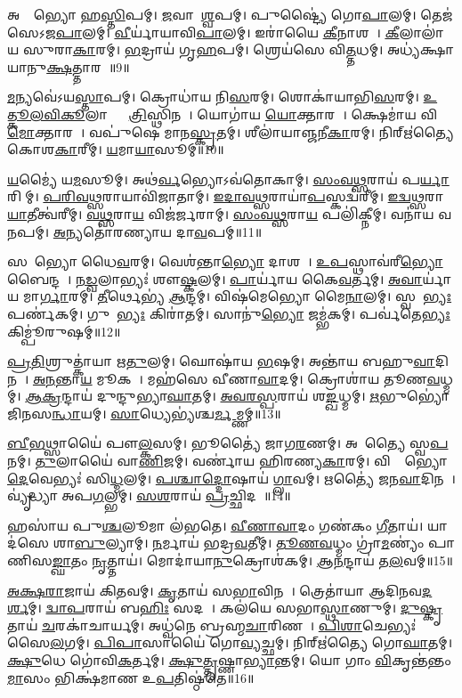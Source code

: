 𑌅𑌰𑍍𑌮𑍇᳚𑌭𑍍𑌯𑍋 𑌹\ul{𑌸𑍍𑌤𑌿}𑌪𑌮𑍍।
\ul{𑌜}𑌵𑌾𑌯𑌾᳚\ul{𑌶𑍍𑌵}𑌪𑌮𑍍।
𑌪𑍁𑌷𑍍𑌟𑍍𑌯𑍈॑ 𑌗𑍋\ul{𑌪𑌾}𑌲𑌮𑍍।
𑌤𑍇𑌜॑𑌸𑍇\-𑌽𑌜\ul{𑌪𑌾}𑌲𑌮𑍍।
\ul{𑌵𑍀}𑌰𑍍𑌯𑌾॑𑌯𑌾𑌵𑌿\ul{𑌪𑌾}𑌲𑌮𑍍।
𑌇𑌰𑌾॑𑌯𑍈 \ul{𑌕𑍀}𑌨𑌾𑌶𑌮𑍍᳚।
\ul{𑌕𑍀}𑌲𑌾𑌲𑌾॑𑌯 𑌸𑍁𑌰𑌾\ul{𑌕𑌾}𑌰𑌮𑍍।
\ul{𑌭}𑌦𑍍𑌰𑌾𑌯॑ 𑌗𑍃\ul{𑌹}𑌪𑌮𑍍।
𑌶𑍍𑌰𑍇𑌯॑𑌸𑍇 𑌵𑌿\ul{𑌤𑍍𑌤}𑌧𑌮𑍍।
𑌅𑌧𑍍𑌯॑𑌕𑍍𑌷𑌾𑌯𑌾𑌨𑍁\ul{𑌕𑍍𑌷}𑌤𑍍𑌤𑌾𑌰𑌮𑍍᳚॥9॥

\ul{𑌮}𑌨𑍍𑌯𑌵𑍇॑\-𑌽𑌯\ul{𑌸𑍍𑌤𑌾}𑌪𑌮𑍍।
𑌕𑍍𑌰𑍋𑌧𑌾॑𑌯 𑌨𑌿\ul{𑌸}𑌰𑌮𑍍।
𑌶𑍋𑌕𑌾॑𑌯𑌾𑌭𑌿\ul{𑌸}𑌰𑌮𑍍।
\ul{𑌉}\ul{𑌤𑍍𑌕𑍂}\ul{𑌲}\ul{𑌵𑌿}\ul{𑌕𑍂}𑌲𑌾𑌭𑍍𑌯𑌾𑌂᳚ \ul{𑌤𑍍𑌰𑌿}𑌸𑍍𑌥𑌿𑌨𑌮𑍍᳚।
𑌯𑍋𑌗𑌾॑𑌯 \ul{𑌯𑍋}𑌕𑍍𑌤𑌾𑌰𑌮𑍍᳚।
𑌕𑍍𑌷𑍇𑌮𑌾॑𑌯 𑌵𑌿\ul{𑌮𑍋}𑌕𑍍𑌤𑌾𑌰𑌮𑍍᳚।
𑌵𑌪𑍁॑𑌷𑍇 𑌮𑌾𑌨\ul{𑌸𑍍𑌕𑍃}𑌤𑌮𑍍।
𑌶𑍀𑌲𑌾॑𑌯𑌾𑌞𑍍𑌜𑌨𑍀\ul{𑌕𑌾}𑌰𑌮𑍍।
𑌨𑌿𑌰𑍍\mbox{}𑌋॑𑌤𑍍𑌯𑍈 𑌕𑍋𑌶\ul{𑌕𑌾}𑌰𑍀𑌮𑍍।
\ul{𑌯}𑌮𑌾\ul{𑌯𑌾}𑌸𑍂𑌮𑍍॥10॥

\ul{𑌯}𑌮𑍍𑌯𑍈॑ 𑌯\ul{𑌮}𑌸𑍂𑌮𑍍।
𑌅𑌥॑\ul{𑌰𑍍𑌵}𑌭𑍍𑌯𑍋\-𑌽𑌵॑𑌤𑍋𑌕𑌾𑌮𑍍।
\ul{𑌸𑌂}\ul{𑌵}\ul{𑌥𑍍𑌸}𑌰𑌾𑌯॑ 𑌪\ul{𑌰𑍍𑌯𑌾}𑌰𑌿𑌣𑍀᳚𑌮𑍍।
\ul{𑌪}\ul{𑌰𑌿}\ul{𑌵}\ul{𑌥𑍍𑌸}𑌰𑌾𑌯𑌾\-𑌵𑌿॑𑌜𑌾𑌤𑌾𑌮𑍍।
\ul{𑌇}\ul{𑌦𑌾}\ul{𑌵}\ul{𑌥𑍍𑌸}𑌰𑌾𑌯𑌾॑\ul{𑌪}\-𑌸𑍍𑌕𑌦𑍍𑌵॑𑌰𑍀𑌮𑍍।
\ul{𑌇}\ul{𑌦𑍍𑌵}\ul{𑌥𑍍𑌸}𑌰𑌾\ul{𑌯𑌾}𑌤𑍀𑌤𑍍𑌵॑𑌰𑍀𑌮𑍍।
\ul{𑌵}\ul{𑌥𑍍𑌸}𑌰𑌾\ul{𑌯} 𑌵𑌿𑌜॑𑌰𑍍𑌜𑌰𑌾𑌮𑍍।
\ul{𑌸𑌂}\ul{𑌵}\ul{𑌥𑍍𑌸}𑌰𑌾\ul{𑌯} 𑌪𑌲𑌿॑𑌕𑍍𑌨𑍀𑌮𑍍।
𑌵𑌨𑌾॑𑌯 𑌵\ul{𑌨}𑌪𑌮𑍍।
\ul{𑌅}𑌨𑍍𑌯𑌤𑍋॑𑌰𑌣𑍍𑌯𑌾𑌯 𑌦𑌾\ul{𑌵}𑌪𑌮𑍍॥11॥

𑌸𑌰𑍋᳚𑌭𑍍𑌯𑍋 𑌧𑍈\ul{𑌵}𑌰𑌮𑍍।
𑌵𑍇𑌶॑𑌨𑍍𑌤𑌾\ul{𑌭𑍍𑌯𑍋} 𑌦𑌾𑌶𑌮𑍍᳚।
\ul{𑌉}\ul{𑌪}𑌸𑍍𑌥𑌾𑌵॑𑌰𑍀\ul{𑌭𑍍𑌯𑍋} 𑌬𑍈𑌨𑍍𑌦𑌮𑍍᳚।
\ul{𑌨}\ul{𑌡𑍍𑌵}𑌲𑌾𑌭𑍍𑌯𑌃॑ 𑌶𑍗\ul{𑌷𑍍𑌕}𑌲𑌮𑍍।
\ul{𑌪𑌾}𑌰𑍍𑌯𑌾॑𑌯 𑌕𑍈\ul{𑌵}𑌰𑍍𑌤𑌮𑍍।
\ul{𑌅}\ul{𑌵𑌾}𑌰𑍍𑌯𑌾॑𑌯 𑌮𑌾\ul{𑌰𑍍𑌗𑌾}𑌰𑌮𑍍।
\ul{𑌤𑍀}𑌰𑍍𑌥𑍇𑌭𑍍𑌯॑ \ul{𑌆}𑌨𑍍𑌦𑌮𑍍।
𑌵𑌿𑌷॑𑌮𑍇𑌭𑍍𑌯𑍋 𑌮𑍈\ul{𑌨𑌾}𑌲𑌮𑍍।
𑌸𑍍𑌵𑌨𑍇᳚\ul{𑌭𑍍𑌯𑌃} 𑌪𑌰𑍍𑌣॑𑌕𑌮𑍍।
𑌗𑍁𑌹𑌾᳚\ul{𑌭𑍍𑌯𑌃} 𑌕𑌿𑌰𑌾॑𑌤𑌮𑍍।
𑌸𑌾𑌨𑍁॑\ul{𑌭𑍍𑌯𑍋} 𑌜𑌮𑍍𑌭॑𑌕𑌮𑍍।
𑌪𑌰𑍍𑌵॑𑌤𑍇\ul{𑌭𑍍𑌯𑌃} 𑌕𑌿𑌮𑍍𑌪𑍂॑𑌰𑍁𑌷𑌮𑍍॥12॥

\ul{𑌪𑍍𑌰}\ul{𑌤𑌿}𑌶𑍍𑌰𑍁𑌤𑍍𑌕𑌾॑𑌯𑌾 𑌋\ul{𑌤𑍁}𑌲𑌮𑍍।
𑌘𑍋𑌷𑌾॑𑌯 \ul{𑌭}𑌷𑌮𑍍।
𑌅𑌨𑍍𑌤𑌾॑𑌯 𑌬𑌹𑍁\ul{𑌵𑌾}𑌦𑌿𑌨𑌮𑍍᳚।
\ul{𑌅}\ul{𑌨}𑌨𑍍𑌤𑌾\ul{𑌯} 𑌮𑍂𑌕𑌮𑍍᳚।
𑌮𑌹॑𑌸𑍇 𑌵𑍀𑌣𑌾\ul{𑌵𑌾}𑌦𑌮𑍍।
𑌕𑍍𑌰𑍋𑌶𑌾॑𑌯 𑌤𑍂𑌣\ul{𑌵}𑌧𑍍𑌮𑌮𑍍।
\ul{𑌆}\ul{𑌕𑍍𑌰}𑌨𑍍𑌦𑌾𑌯॑ 𑌦𑍁𑌨𑍍𑌦𑍁𑌭𑍍𑌯𑌾\ul{𑌘𑌾}𑌤𑌮𑍍।
\ul{𑌅}\ul{𑌵}\ul{𑌰}\ul{𑌸𑍍𑌪}𑌰𑌾𑌯॑ 𑌶\ul{𑌙𑍍𑌖}𑌧𑍍𑌮𑌮𑍍।
\ul{𑌋}𑌭𑍁𑌭𑍍𑌯𑍋॑𑌜𑌿𑌨𑌸\ul{𑌨𑍍𑌧𑌾}𑌯𑌮𑍍।
\ul{𑌸𑌾}𑌧𑍍𑌯𑍇𑌭𑍍𑌯॑𑌶𑍍𑌚\ul{𑌰𑍍𑌮}𑌮𑍍𑌣𑌮𑍍॥13॥

\ul{𑌬𑍀}\ul{𑌭}𑌥𑍍𑌸𑌾𑌯𑍈॑ 𑌪𑍗\ul{𑌲𑍍𑌕}𑌸𑌮𑍍।
𑌭𑍂𑌤𑍍𑌯𑍈॑ 𑌜𑌾𑌗\ul{𑌰}𑌣𑌮𑍍।
𑌅𑌭𑍂᳚𑌤𑍍𑌯𑍈 𑌸𑍍𑌵\ul{𑌪}𑌨𑌮𑍍।
\ul{𑌤𑍁}𑌲𑌾𑌯𑍈॑ 𑌵𑌾\ul{𑌣𑌿}𑌜𑌮𑍍।
𑌵𑌰𑍍𑌣𑌾॑𑌯 𑌹𑌿𑌰𑌣𑍍𑌯\ul{𑌕𑌾}𑌰𑌮𑍍।
𑌵𑌿𑌶𑍍𑌵𑍇᳚𑌭𑍍𑌯𑍋 \ul{𑌦𑍇}𑌵𑍇𑌭𑍍𑌯𑌃॑ 𑌸𑌿\ul{𑌧𑍍𑌮}𑌲𑌮𑍍।
\ul{𑌪}\ul{𑌶𑍍𑌚𑌾}\ul{𑌦𑍍𑌦𑍋}𑌷𑌾𑌯॑ \ul{𑌗𑍍𑌲𑌾}𑌵𑌮𑍍।
𑌋𑌤𑍍𑌯𑍈॑ 𑌜𑌨\ul{𑌵𑌾}𑌦𑌿𑌨𑌮𑍍᳚।
𑌵𑍍𑌯𑍃॑𑌦𑍍𑌧𑍍𑌯𑌾 𑌅𑌪\ul{𑌗}𑌲𑍍𑌭𑌮𑍍।
\ul{𑌸}\ul{}\ul{𑌶}𑌰𑌾𑌯॑ \ul{𑌪𑍍𑌰}𑌚𑍍𑌛𑌿𑌦𑌮𑍍᳚॥14॥

𑌹𑌸𑌾॑𑌯 𑌪𑍁\ul{𑌶𑍍𑌚}𑌲𑍂𑌮𑌾 𑌲॑𑌭𑌤𑍇।
\ul{𑌵𑍀}\ul{𑌣𑌾}\ul{𑌵𑌾}𑌦𑌂 𑌗𑌣॑𑌕𑌂 \ul{𑌗𑍀}𑌤𑌾𑌯॑।
𑌯𑌾𑌦॑𑌸𑍇 𑌶𑌾\ul{𑌬𑍁}𑌲𑍍𑌯𑌾𑌮𑍍।
\ul{𑌨}𑌰𑍍𑌮𑌾𑌯॑ 𑌭𑌦𑍍𑌰\ul{𑌵}𑌤𑍀𑌮𑍍।
\ul{𑌤𑍂}\ul{𑌣}\ul{𑌵}𑌧𑍍𑌮𑌂 𑌗𑍍𑌰𑌾॑\ul{𑌮}𑌣𑍍𑌯𑌂॑ 𑌪𑌾𑌣𑌿𑌸\ul{𑌙𑍍𑌘𑌾}𑌤𑌂 \ul{𑌨𑍃}𑌤𑍍𑌤𑌾𑌯॑।
𑌮𑍋𑌦𑌾॑𑌯𑌾\ul{𑌨𑍁}𑌕𑍍𑌰𑍋𑌶॑𑌕𑌮𑍍।
\ul{𑌆}\ul{𑌨}𑌨𑍍𑌦𑌾𑌯॑ 𑌤\ul{𑌲}𑌵𑌮𑍍॥15॥

\ul{𑌅}\ul{𑌕𑍍𑌷}\ul{𑌰𑌾}𑌜𑌾𑌯॑ 𑌕𑌿\ul{𑌤}𑌵𑌮𑍍।
\ul{𑌕𑍃}𑌤𑌾𑌯॑ 𑌸\ul{𑌭𑌾}𑌵𑌿𑌨𑌮𑍍᳚।
𑌤𑍍𑌰𑍇𑌤𑌾॑𑌯𑌾 𑌆𑌦𑌿𑌨𑌵\ul{𑌦}\ul{𑌰𑍍}𑌶𑌮𑍍।
\ul{𑌦𑍍𑌵𑌾}\ul{𑌪}𑌰𑌾𑌯॑ 𑌬\ul{𑌹𑌿𑌃} 𑌸𑌦𑌮𑍍᳚।
𑌕𑌲॑𑌯𑍇 𑌸𑌭𑌾\ul{𑌸𑍍𑌥𑌾}𑌣𑍁𑌮𑍍।
\ul{𑌦𑍁}\ul{𑌷𑍍𑌕𑍃}𑌤𑌾𑌯॑ \ul{𑌚}𑌰𑌕𑌾॑𑌚𑌾𑌰𑍍𑌯𑌮𑍍।
𑌅𑌧𑍍𑌵॑𑌨𑍇 𑌬𑍍𑌰𑌹𑍍𑌮\ul{𑌚𑌾}𑌰𑌿𑌣𑌮𑍍᳚।
\ul{𑌪𑌿}\ul{𑌶𑌾}𑌚𑍇𑌭𑍍𑌯𑌃॑ 𑌸𑍈\ul{𑌲}𑌗𑌮𑍍।
\ul{𑌪𑌿}\ul{𑌪𑌾}𑌸𑌾𑌯𑍈॑ 𑌗𑍋\ul{𑌵𑍍𑌯}𑌚𑍍𑌛𑌮𑍍।
𑌨𑌿𑌰𑍍\mbox{}𑌋॑𑌤𑍍𑌯𑍈 𑌗𑍋\ul{𑌘𑌾}𑌤𑌮𑍍।
\ul{𑌕𑍍𑌷𑍁}𑌧𑍇 𑌗𑍋॑𑌵𑌿\ul{𑌕}𑌰𑍍𑌤𑌮𑍍।
\ul{𑌕𑍍𑌷𑍁}\ul{𑌤𑍍𑌤𑍃}𑌷𑍍𑌣𑌾\ul{𑌭𑍍𑌯𑌾}𑌨𑍍𑌤𑌮𑍍।
𑌯𑍋 𑌗𑌾𑌂 \ul{𑌵𑌿}𑌕𑍃𑌨𑍍𑌤॑𑌨𑍍𑌤𑌂 \ul{𑌮𑌾}\ul{}𑌸𑌂 𑌭𑌿𑌕𑍍𑌷॑𑌮𑌾𑌣 𑌉\ul{𑌪}𑌤𑌿𑌷𑍍𑌠॑𑌤𑍇॥16॥

